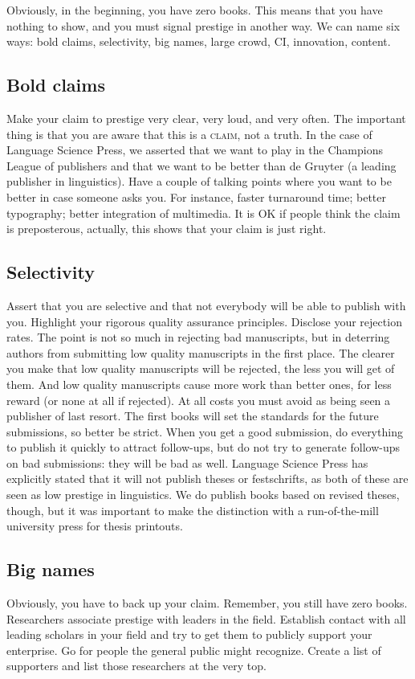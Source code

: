 \documentclass[guidelines,nonflat,modfonts] {langsci/langscibook}
\begin{document}
Obviously, in the beginning, you have zero books. This means that you have nothing to show, and you must signal prestige in another way. We can name six ways: %
bold claims, 
selectivity, 
big names, 
large crowd, 
CI, 
innovation,
content. 

\subsection{Bold claims}
Make your claim to prestige very clear, very loud, and very often. The important thing is that you are aware that this is a \textsc{claim}, not a truth. In the case of Language Science Press, we asserted that we want to play in the Champions League of publishers and that we want to be better than de Gruyter (a leading publisher in linguistics). Have a couple of talking points where you want to be better in case someone asks you. For instance, faster turnaround time; better typography; better integration of multimedia. It is OK if people think the claim is preposterous, actually, this shows that your claim is just right. 

\subsection{Selectivity}
Assert that you are selective and that not everybody will be able to publish with you. Highlight your rigorous quality assurance principles. Disclose your rejection rates. The point is not so much in rejecting bad manuscripts, but in deterring authors from submitting low quality manuscripts in the first place. The clearer you make that low quality manuscripts will be rejected, the less you will get of them. And low quality manuscripts cause more work than better ones, for less reward (or none at all if rejected). 
At all costs you must avoid as being seen a publisher of last resort. The first books will set the standards for the future submissions, so better be strict. When you get a good submission, do everything to publish it quickly to attract follow-ups, but do not try to generate follow-ups on bad submissions: they will be bad as well. 
Language Science Press has explicitly stated that it will not publish theses or festschrifts, as both of these are seen as low prestige in linguistics. We do publish books based on revised theses, though, but it was important to make the distinction with a run-of-the-mill university press for thesis printouts.


\subsection{Big names}
Obviously, you have to back up your claim. Remember, you still have zero books. Researchers associate prestige with leaders in the field. Establish contact with all leading scholars in your field and try to get them to publicly support your enterprise. Go for people the general public might recognize. Create a list of supporters and list those researchers at the very top.  
\end{document}
